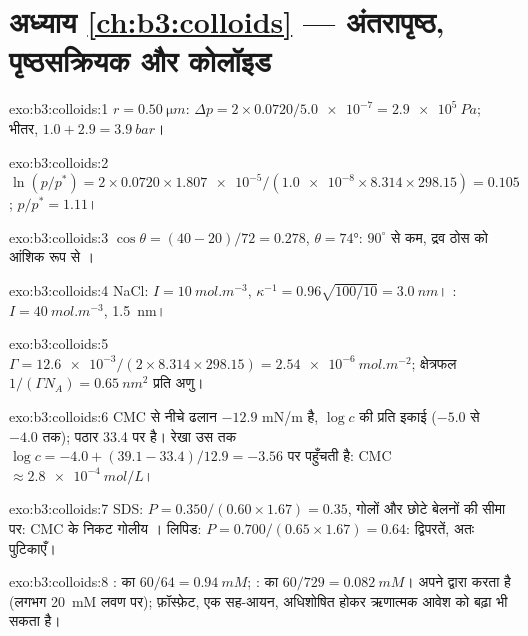 \section*{अध्याय \ref{ch:b3:colloids} --- अंतरापृष्ठ, पृष्ठसक्रियक और कोलॉइड}

\begin{solution}{exo:b3:colloids:1}
$r = \qty{0.50}{\micro m}$: $\Delta p = 2 \times 0.0720/\num{5.0e-7} = \qty{2.9e5}{Pa}$; भीतर, $1.0 + 2.9 = \qty{3.9}{bar}$।
\end{solution}

\begin{solution}{exo:b3:colloids:2}
$\ln(p/p^*) = 2 \times 0.0720 \times \num{1.807e-5}/(\num{1.0e-8} \times 8.314 \times 298.15) = 0.105$; $p/p^* = 1.11$।
\end{solution}

\begin{solution}{exo:b3:colloids:3}
$\cos\theta = (40 - 20)/72 = 0.278$, $\theta = \ang{74}$: $90^\circ$ से कम, द्रव ठोस को
आंशिक रूप से ।
\end{solution}

\begin{solution}{exo:b3:colloids:4}
NaCl: $I = \qty{10}{mol.m^{-3}}$, $\kappa^{-1} = 0.96\sqrt{100/10} = \qty{3.0}{nm}$। : $I = \qty{40}{mol.m^{-3}}$, \qty{1.5}{nm}।
\end{solution}

\begin{solution}{exo:b3:colloids:5}
$\Gamma = \num{12.6e-3}/(2 \times 8.314 \times 298.15) = \qty{2.54e-6}{mol.m^{-2}}$; क्षेत्रफल $1/(\Gamma N_A) =
\qty{0.65}{nm^2}$ प्रति अणु।
\end{solution}

\begin{solution}{exo:b3:colloids:6}
CMC से नीचे ढलान $-12.9$ \unit{mN/m} है, $\log c$ की प्रति इकाई ($-5.0$ से $-4.0$ तक); पठार
33.4 पर है। रेखा उस तक $\log c = -4.0 + (39.1 - 33.4)/12.9 = -3.56$ पर पहुँचती है: CMC
$\approx \qty{2.8e-4}{mol/L}$।
\end{solution}

\begin{solution}{exo:b3:colloids:7}
SDS: $P = 0.350/(0.60 \times 1.67) = 0.35$, गोलों और छोटे बेलनों की
सीमा पर: CMC के निकट गोलीय । लिपिड: $P = 0.700/(0.65 \times 1.67) = 0.64$:
द्विपरतें, अतः पुटिकाएँ।
\end{solution}

\begin{solution}{exo:b3:colloids:8}
:  का $60/64 = \qty{0.94}{mM}$; :  का $60/729 = \qty{0.082}{mM}$। 
अपने  द्वारा  करता है (लगभग \qty{20}{mM} लवण पर); फ़ॉस्फ़ेट, एक
सह-आयन, अधिशोषित होकर ऋणात्मक आवेश को बढ़ा भी सकता है।
\end{solution}


